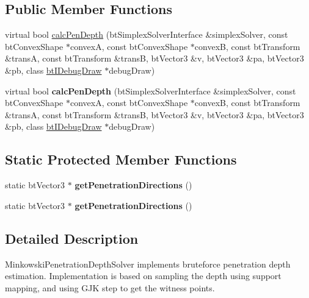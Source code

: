 \subsection*{Public Member Functions}
\begin{DoxyCompactItemize}
\item 
virtual bool \hyperlink{classbtMinkowskiPenetrationDepthSolver_ada75e93337af3d895f0f33f3140361c7}{calc\+Pen\+Depth} (bt\+Simplex\+Solver\+Interface \&simplex\+Solver, const bt\+Convex\+Shape $\ast$convexA, const bt\+Convex\+Shape $\ast$convexB, const bt\+Transform \&transA, const bt\+Transform \&transB, bt\+Vector3 \&v, bt\+Vector3 \&pa, bt\+Vector3 \&pb, class \hyperlink{classbtIDebugDraw}{bt\+I\+Debug\+Draw} $\ast$debug\+Draw)
\item 
\mbox{\label{classbtMinkowskiPenetrationDepthSolver_a25adbd4ac3fc3d3b939c768ffaeef8c2}} 
virtual bool {\bfseries calc\+Pen\+Depth} (bt\+Simplex\+Solver\+Interface \&simplex\+Solver, const bt\+Convex\+Shape $\ast$convexA, const bt\+Convex\+Shape $\ast$convexB, const bt\+Transform \&transA, const bt\+Transform \&transB, bt\+Vector3 \&v, bt\+Vector3 \&pa, bt\+Vector3 \&pb, class \hyperlink{classbtIDebugDraw}{bt\+I\+Debug\+Draw} $\ast$debug\+Draw)
\end{DoxyCompactItemize}
\subsection*{Static Protected Member Functions}
\begin{DoxyCompactItemize}
\item 
\mbox{\label{classbtMinkowskiPenetrationDepthSolver_a2b606f614668dcb03bf86c88f035e702}} 
static bt\+Vector3 $\ast$ {\bfseries get\+Penetration\+Directions} ()
\item 
\mbox{\label{classbtMinkowskiPenetrationDepthSolver_afeda5b0b31ee75c3c6d52b1116df5af5}} 
static bt\+Vector3 $\ast$ {\bfseries get\+Penetration\+Directions} ()
\end{DoxyCompactItemize}


\subsection{Detailed Description}
Minkowski\+Penetration\+Depth\+Solver implements bruteforce penetration depth estimation. Implementation is based on sampling the depth using support mapping, and using G\+JK step to get the witness points. 

